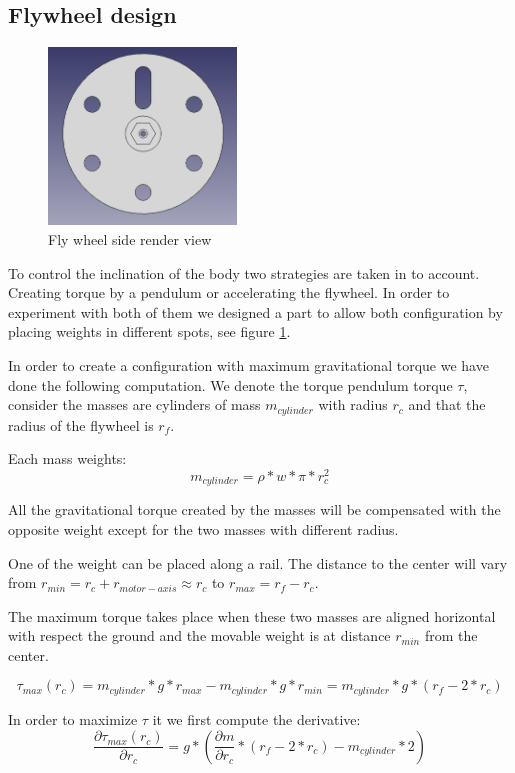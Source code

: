 \subsection{Flywheel design}
\begin{figure}
	\centering
	\includegraphics[width=5cm]{img/fly_wheel_side.png}
	\caption{Fly wheel side render view}
	\label{fig:Fly wheel side render view}
\end{figure}

To control the inclination of the body two strategies are taken in to account. Creating torque by a pendulum or accelerating the flywheel. In order to experiment with both of them we designed a part to allow both configuration by placing weights in different spots, see figure \ref{fig:Fly wheel side render view}.

In order to create a configuration with maximum gravitational torque we have done the following computation. We denote the torque pendulum torque $\tau$, consider the masses are cylinders of mass $m_{cylinder}$ with radius $r_c$ and that the radius of the flywheel is $r_f$.

Each mass weights:
\[ m_{cylinder} = \rho * w * \pi * r_c^2 \]

All the gravitational torque created by the masses will be compensated with the opposite weight except for the two masses with different radius.

One of the weight can be placed along a rail. The distance to the center will vary from $r_{min} = r_c + r_{motor-axis} \approx r_c $ to $r_{max} = r_f - r_c$. 

The maximum torque takes place when these two masses are aligned horizontal with respect the ground and the movable weight is at distance $r_{min}$ from the center.

\[ \tau _{max} (r_c) =  m_{cylinder} * g * r_{max} -  m_{cylinder} * g * r_{min} =  m_{cylinder}* g * (r_f - 2 * r_c) \]

In order to maximize $\tau$ it we first compute the derivative:
\[\frac{\partial \tau _{max} (r_c)}{\partial r_c} = g *(\frac{\partial m}{\partial r_c} * (r_f - 2 * r_c) -  m_{cylinder} * 2)\]

